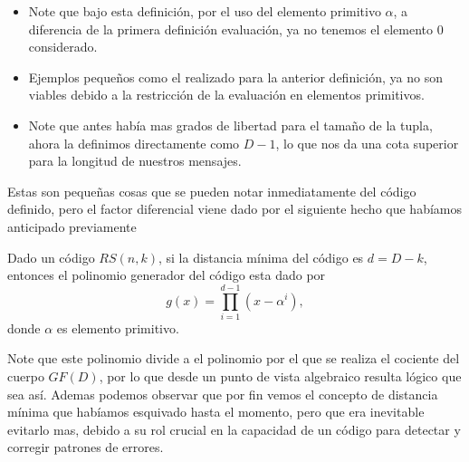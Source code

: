\begin{itemize}
    \item Note que bajo esta definición, por el uso del elemento primitivo $\alpha$, a diferencia de la primera definición evaluación, ya no tenemos el elemento $0$ considerado.
    \item Ejemplos pequeños como el realizado para la anterior definición, ya no son viables debido a la restricción de la evaluación en elementos primitivos.
    \item Note que antes había mas grados de libertad para el tamaño de la tupla, ahora la definimos directamente como $D-1$, lo que nos da una cota superior para la longitud de nuestros mensajes.
\end{itemize}
Estas son pequeñas cosas que se pueden notar inmediatamente del código definido, pero el factor diferencial viene dado por el siguiente hecho que habíamos anticipado previamente
\begin{theorem}
    Dado un código $RS(n,k)$, si la distancia mínima del código es $d=D-k$, entonces el polinomio generador del código esta dado por
    $$g(x)=\prod_{i=1}^{d-1}(x-\alpha^i),$$
    donde $\alpha$ es elemento primitivo.
\end{theorem}

Note que este polinomio divide a el polinomio por el que se realiza el cociente del cuerpo $GF(D)$, por lo que desde un punto de vista algebraico resulta lógico que sea así. Ademas podemos observar que por fin vemos el concepto de distancia mínima que habíamos esquivado hasta el momento, pero que era inevitable evitarlo mas, debido a su rol crucial en la capacidad de un código para detectar y corregir patrones de errores.







